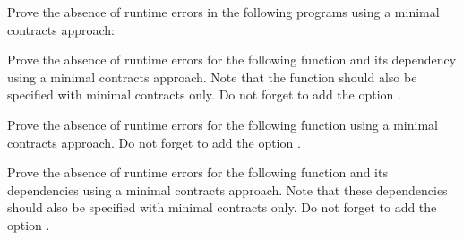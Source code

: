 Prove the absence of runtime errors in the following programs using a minimal
contracts approach:






Prove the absence of runtime errors for the following 
function and its dependency using a minimal contracts approach. Note that the
 function should also be specified with minimal contracts only.
Do not forget to add the option .







Prove the absence of runtime errors for the following 
function using a minimal contracts approach. Do not forget to add the option
.






Prove the absence of runtime errors for the following 
function and its dependencies using a minimal contracts approach. Note that
these dependencies should also be specified with minimal contracts only.
Do not forget to add the option .


